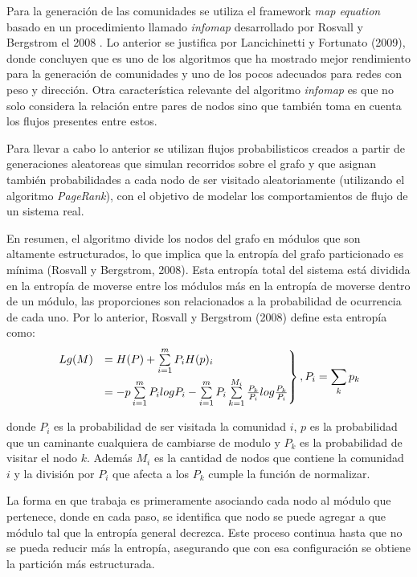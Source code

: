 \documentclass[12pt]{article}
\begin{document}
	Para la generación de las comunidades se utiliza el framework \textit{map equation} basado en un procedimiento llamado \textit{infomap} desarrollado por Rosvall y Bergstrom el 2008 \cite{Infomap}. Lo anterior se justifica por Lancichinetti y Fortunato (2009)\cite{Comparar_generador_comunidad}, donde concluyen que es uno de los algoritmos que ha mostrado mejor rendimiento para la generación de comunidades y uno de los pocos adecuados para redes con peso y dirección. Otra característica relevante del algoritmo \textit{infomap} es que no solo considera la relación entre pares de nodos sino que también toma en cuenta los flujos presentes entre estos. 
	
	Para llevar a cabo lo anterior se utilizan flujos probabilisticos creados a partir de generaciones aleatoreas que simulan recorridos sobre el grafo y que asignan también probabilidades a cada nodo de ser visitado aleatoriamente (utilizando el algoritmo \textit{PageRank}), con el objetivo de modelar los comportamientos de flujo de un sistema real.
	
	En resumen, el algoritmo divide los nodos del grafo en módulos que son altamente estructurados, lo que implica que la entropía del grafo particionado es mínima (Rosvall y Bergstrom, 2008)\cite{Infomap}. Esta entropía total del sistema está dividida en la entropía de moverse entre los módulos más en la entropía de moverse dentro de un módulo, las proporciones son relacionados a la probabilidad de ocurrencia de cada uno. Por lo anterior, Rosvall y Bergstrom (2008) define esta entropía como:
	$$
	\begin{rcases}
	Lg(M) &= H(P) + \sum\limits_{i=1}^m P_i H(p)_i \\
	      &= -p\sum\limits_{i=1}^m P_i log P_i -\sum\limits_{i=1}^m P_i\sum\limits_{k=1}^{M_i} \frac{P_k}{P_i}log\frac{P_k}{P_i}
	\end{rcases} , P_i = \sum_k p_k
	$$
	
donde $P_i$	es la probabilidad de ser visitada la comunidad $i$, $p$ es la probabilidad que un caminante cualquiera de cambiarse de modulo y $P_k$ es la probabilidad de visitar el nodo $k$. Además $M_i$ es la cantidad de nodos que contiene la comunidad $i$ y la división por $P_i$ que afecta a los $P_k$ cumple la función de normalizar.

La forma en que trabaja es primeramente asociando cada nodo al módulo que pertenece, donde en cada paso, se identifica que nodo se puede agregar a que módulo tal que la entropía general decrezca. Este proceso continua hasta que no se pueda reducir más la entropía, asegurando que con esa configuración se obtiene la partición más estructurada.
\end{document}
